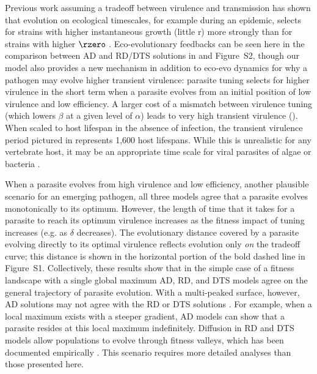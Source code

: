 Previous work assuming a tradeoff between virulence and transmission has shown that evolution on ecological timescales, for example during an epidemic, selects for strains with higher instantaneous growth (little r) more strongly than for strains with higher $\rzero$ \citep{DayandProulx2004, Bolkeretal.2010}. Eco-evolutionary feedbacks can be seen here in the comparison between AD and RD/DTS solutions in  and Figure~S2, though our model also provides a new mechanism in addition to eco-evo dynamics for why a pathogen may evolve higher transient virulence: parasite tuning selects for higher virulence in the short term when a parasite evolves from an initial position of low virulence and low efficiency. A larger cost of a mismatch between virulence tuning (which lowers $\beta$ at a given level of $\alpha$) leads to very high transient virulence (). When scaled to host lifespan in the absence of infection, the transient virulence period pictured in  represents 1,600 host lifespans. While this is unrealistic for any vertebrate host, it may be an appropriate time scale for viral parasites of algae \citep{Frickeletal.2016, Frickeletal.2018} or bacteria \cite{Berngruberetal.2015}.

When a parasite evolves from high virulence and low efficiency, another plausible scenario for an emerging pathogen, all three models agree that a parasite evolves monotonically to its optimum. However, the length of time that it takes for a parasite to reach its optimum virulence increases as the fitness impact of tuning increases (e.g. as $\delta$ decreases). The evolutionary distance covered by a parasite evolving directly to its optimal virulence reflects evolution only \emph{on} the tradeoff curve; this distance is shown in the horizontal portion of the bold dashed line in Figure~S1. Collectively, these results show that in the simple case of a fitness landscape with a single global maximum AD, RD, and DTS models agree on the general trajectory of parasite evolution. With a multi-peaked surface, however, AD solutions may not agree with the RD or DTS solutions \citep{Dieckmann2002}. For example, when a local maximum exists with a steeper gradient, AD models can show that a parasite resides at this local maximum indefinitely. Diffusion in RD and DTS models allow populations to evolve through fitness valleys, which has been documented empirically \citep{JainandJoachim2007, Gokhaleetal.2009, Weissmanetal.2010}. This scenario requires more detailed analyses than those presented here.

